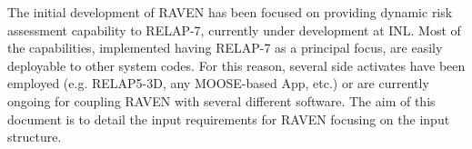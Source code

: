 The initial development of RAVEN has been focused on providing dynamic risk
assessment capability to RELAP-7, currently under development at INL.
%
Most of the capabilities, implemented having RELAP-7 as a principal focus, are
easily deployable to other system codes.
%
For this reason, several side activates have been employed (e.g.  RELAP5-3D, any MOOSE-based App, etc.)
or are currently ongoing for coupling RAVEN with several different software.
%
The aim of this document is to detail the input requirements for RAVEN focusing
on the input structure.
